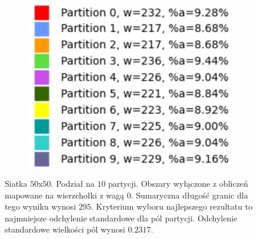 \begin{figure}[h]
\begin{subfigure}{.33\textwidth}
    \centering
    \includegraphics[width=0.9\linewidth]{images/results/m_k/with/11/results}
    \caption[short]{}
\end{subfigure}
\caption{Siatka $50$x$50$. Podział na $10$ partycji.
Obszary wyłączone z obliczeń mapowane na wierzchołki z wagą $0$.
Sumaryczna długość granic dla tego wyniku wynosi $295$.
Kryterium wyboru najlepszego rezultatu to najmniejsze odchylenie standardowe dla pól partycji.
Odchylenie standardowe wielkości pól wynosi $0.2317$.}
\label{result:11}
\end{figure}
